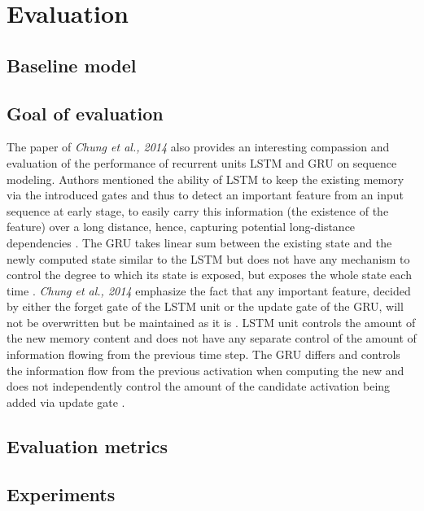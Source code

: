 
\chapter{Evaluation}
\label{sec:eval}

\section{Baseline model}
\label{sec:eval:baseline}

\section{Goal of evaluation}
\label{sec:eval:goal}

The paper of \textit{Chung et al., 2014}  also provides an interesting compassion and evaluation of the performance of recurrent units LSTM and GRU on sequence modeling. Authors mentioned the ability of LSTM to keep the existing memory via the introduced gates and thus to detect an important feature from an input sequence at early stage, to easily carry this information (the existence of the feature) over a long distance, hence, capturing potential long-distance dependencies \cite{empirical_evaluation}. The GRU takes linear sum between the existing state and the newly computed state similar to the LSTM but does not have any mechanism to control the degree to which its state is exposed, but exposes the whole state each time \cite{empirical_evaluation}. \textit{Chung et al., 2014} emphasize the fact that any important feature, decided by either the forget gate of the LSTM unit or the update gate of the GRU, will not be overwritten but be maintained as it is \cite{empirical_evaluation}. LSTM unit controls the amount of the new memory content and does not have any separate control of the amount of information flowing from the previous time step. The GRU differs and controls the information flow from the previous activation when computing the new and does not independently control the amount of the candidate activation being added via update gate \cite{empirical_evaluation}.

\section{Evaluation metrics}
\label{sec:eval:metrics}

\section{Experiments}
\label{sec:eval:experiments}

